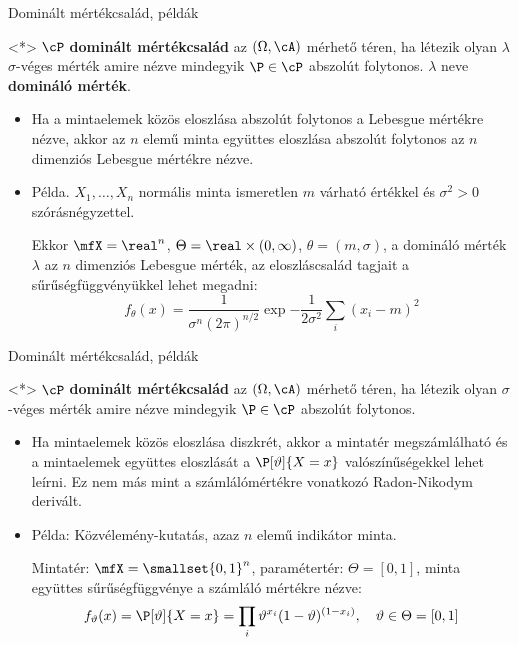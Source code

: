 \documentclass[aspectratio=169,notheorems,9pt,\option]{beamer}
\begin{document}
\begin{frame}{Dominált mértékcsalád, példák}
  \begin{df}<*>
    $\cP$ \textbf{dominált mértékcsalád} az $(\Omega,\cA)$ mérhető téren, 
    ha létezik olyan $\lambda$ $\sigma$-véges 
    mérték amire nézve mindegyik $\P\in\cP$ abszolút folytonos. 
    $\lambda$ neve \textbf{domináló mérték}.
  \end{df}
 
  \begin{itemize}
    \item Ha a mintaelemek közös eloszlása abszolút folytonos a Lebesgue mértékre nézve, akkor az $n$ elemű minta 
    együttes eloszlása abszolút folytonos az $n$ dimenziós Lebesgue mértékre nézve.

    \item Példa. $X_1,\dots,X_n$ normális minta ismeretlen $m$ várható értékkel és $\sigma^2>0$ szórásnégyzettel. 
    
    Ekkor $\mfX=\real^n$, $\Theta=\real\times(0,\infty)$, $\theta=(m,\sigma)$, 
    a domináló mérték $\lambda$ az $n$ dimenziós Lebesgue mérték, az eloszláscsalád tagjait 
    a sűrűségfüggvényükkel lehet megadni:
    \begin{displaymath}
      f_{\theta}(x)=\frac{1}{\sigma^n (2\pi)^{n/2}}\exp{-\frac1{2\sigma^2}\sum_i(x_i-m)^2}
    \end{displaymath}
  \end{itemize}
\end{frame}

\begin{frame}{Dominált mértékcsalád, példák}
  \begin{df}<*>
    $\cP$ \textbf{dominált mértékcsalád} az $(\Omega,\cA)$ mérhető téren, ha létezik olyan $\sigma$-véges 
    mérték amire nézve mindegyik $\P\in\cP$ abszolút folytonos.
  \end{df}
 
  \begin{itemize}
    \item Ha mintaelemek közös eloszlása diszkrét, akkor a mintatér megszámlálható és a mintaelemek együttes eloszlását a 
    $\P[\theta]{X=x}$ valószínűségekkel lehet leírni. Ez nem más mint a számlálómértékre vonatkozó Radon-Nikodym derivált. 

    \item Példa: Közvélemény-kutatás, azaz $n$ elemű indikátor minta. 
    
    Mintatér: $\mfX=\smallset{0,1}^n$, paramétertér: $\Theta=[0,1]$, minta együttes sűrűségfüggvénye a számláló mértékre nézve:
    \begin{displaymath}
      f_\theta(x)=\P[\theta]{X=x}=\prod_i \theta^{x_i}(1-\theta)^{(1-x_i)},\quad\theta\in\Theta=[0,1]
    \end{displaymath}
  \end{itemize}

\end{frame}
\end{document}

